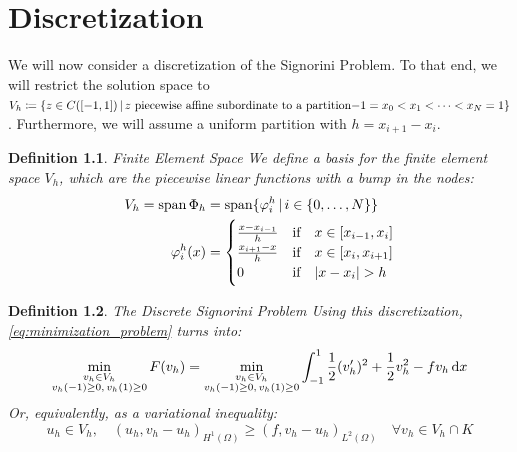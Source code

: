 \documentclass[headsepline,footsepline,footinclude=false,oneside,fontsize=11pt,paper=a4,listof=totoc,bibliography=totoc]{scrbook} %
\newtheorem{definition}{Definition}
\begin{document}
\chapter{Discretization}
We will now consider a discretization of the Signorini Problem. To that end, we will restrict the solution space to $V_h \coloneqq \{z \in C([-1,1]) \, | \, z \,\, \text{piecewise affine subordinate to a partition} \\ \mathmbox{-1}=x_0<x_1<\dots<x_N = 1 \}$. Furthermore, we will assume a uniform partition with $h = x_{i+1} - x_i$.

\begin{definition} Finite Element Space
We define a basis for the finite element space $V_h$, which are the piecewise linear functions with a bump in the nodes:
\begin{align} \label{eq:basis_finite_element_space}
\begin{split}
V_h = \mathrm{span}\,\Phi_h &= \mathrm{span}\{\varphi_i^h \,|\, i \in \{0,\dots,N\}\} \\
\varphi_i^h (x) &= \begin{cases}
\frac{x-x_{i-1}}{h} & \text{if} \quad x\in [x_{i-1},x_i] \\
\frac{x_{i+1}-x}{h} & \text{if} \quad  x\in [x_i,x_{i+1}] \\
0 & \text{if} \quad  \abs{x-x_i} > h
\end{cases}
\end{split}
\end{align}
\end{definition}

\begin{definition} The Discrete Signorini Problem \newline
	Using this discretization, \eqref{eq:minimization_problem} turns into:
	\begin{equation} \label{eq:discrete_minimization}
	\min_{\substack{v_h \in V_h \\ v_h(-1) \geq 0,\, v_h(1) \geq 0}} F(v_h) = \min_{\substack{v_h \in V_h \\ v_h(-1) \geq 0,\, v_h(1) \geq 0}} \int_{-1}^1{\frac{1}{2} (v_h')^2 + \frac{1}{2} v_h^2 - fv_h \dif x} 
	\end{equation}
	Or, equivalently, as a variational inequality:
	\begin{equation}\label{eq:discrete_variational_inequality}
	u_h \in V_h,\quad (u_h, v_h-u_h)_{H^1(\Omega)} \geq (f, v_h - u_h)_{L^2(\Omega)} \quad \forall v_h \in V_h \cap K
	\end{equation}
	
\end{definition}
\end{document}
